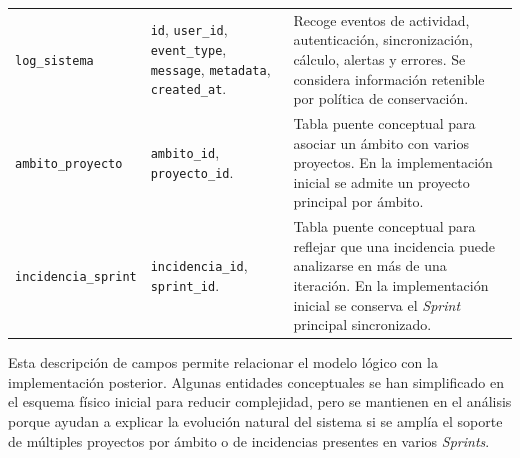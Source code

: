 \begin{landscape}
{\begin{longtable}{>{\raggedright\arraybackslash}p{5.2cm}>{\raggedright\arraybackslash}p{12.0cm}>{\raggedright\arraybackslash}p{6.0cm}}
\texttt{log\_sistema} & \texttt{id}, \texttt{user\_id}, \texttt{event\_type}, \texttt{message}, \texttt{metadata}, \texttt{created\_at}. & Recoge eventos de actividad, autenticación, sincronización, cálculo, alertas y errores. Se considera información retenible por política de conservación. \\
\texttt{ambito\_proyecto} & \texttt{ambito\_id}, \texttt{proyecto\_id}. & Tabla puente conceptual para asociar un ámbito con varios proyectos. En la implementación inicial se admite un proyecto principal por ámbito. \\
\texttt{incidencia\_sprint} & \texttt{incidencia\_id}, \texttt{sprint\_id}. & Tabla puente conceptual para reflejar que una incidencia puede analizarse en más de una iteración. En la implementación inicial se conserva el \textit{Sprint} principal sincronizado. \\
\end{longtable}
}
\end{landscape}

Esta descripción de campos permite relacionar el modelo lógico con la implementación posterior. Algunas entidades conceptuales se han simplificado en el esquema físico inicial para reducir complejidad, pero se mantienen en el análisis porque ayudan a explicar la evolución natural del sistema si se amplía el soporte de múltiples proyectos por ámbito o de incidencias presentes en varios \textit{Sprints}.

\FloatBarrier
